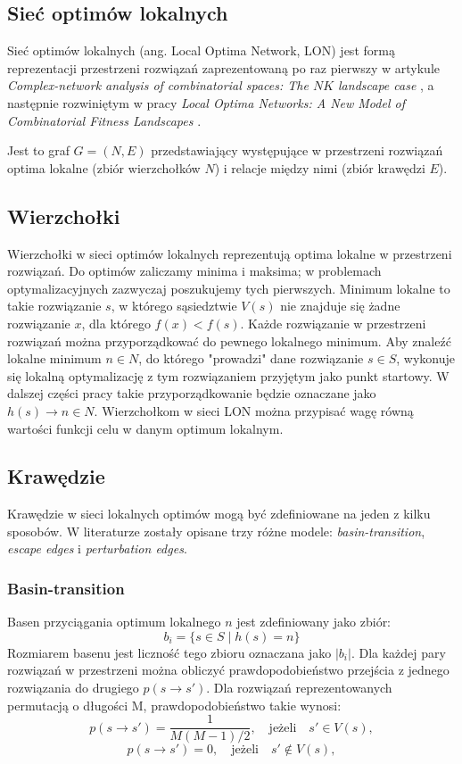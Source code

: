 \subsection{Sieć optimów lokalnych}
Sieć optimów lokalnych (ang. Local Optima Network, LON) jest formą reprezentacji przestrzeni rozwiązań zaprezentowaną po raz pierwszy w artykule \textit{Complex-network analysis of combinatorial spaces: The $NK$ landscape case} \cite{PhysRevE.78.066114},
a następnie rozwiniętym w pracy \textit{Local Optima Networks: A New Model of Combinatorial Fitness Landscapes} \cite{DBLP:journals/corr/OchoaVDT14}.

Jest to graf $G = (N, E)$ przedstawiający występujące w przestrzeni rozwiązań optima lokalne (zbiór wierzchołków $N$)
i relacje między nimi (zbiór krawędzi $E$).

\subsection{Wierzchołki}
Wierzchołki w sieci optimów lokalnych reprezentują optima lokalne w przestrzeni rozwiązań.
Do optimów zaliczamy minima i maksima; w problemach optymalizacyjnych zazwyczaj poszukujemy tych pierwszych.
Minimum lokalne to takie rozwiązanie $s$, w którego sąsiedztwie $V(s)$ nie znajduje się żadne rozwiązanie $x$, dla którego $f(x) < f(s)$.
Każde rozwiązanie w przestrzeni rozwiązań można przyporządkować do pewnego lokalnego minimum.
Aby znaleźć lokalne minimum $n \in{N}$, do którego "prowadzi" dane rozwiązanie $s\in{S}$, wykonuje się lokalną optymalizację
z tym rozwiązaniem przyjętym jako punkt startowy.
W dalszej części pracy takie przyporządkowanie będzie oznaczane jako $h(s) \rightarrow n\in{N}$.
Wierzchołkom w sieci LON można przypisać wagę równą wartości funkcji celu w danym optimum lokalnym.

\subsection{Krawędzie}
Krawędzie w sieci lokalnych optimów mogą być zdefiniowane na jeden z kilku sposobów.
W literaturze \cite{DBLP:journals/corr/OchoaVDT14} \cite{DBLP:conf/gecco/TeixeiraP22} zostały opisane trzy różne modele:
\textit{basin-transition}, \textit{escape edges} i \textit{perturbation edges}.

\subsubsection{Basin-transition}
Basen przyciągania optimum lokalnego $n$ jest zdefiniowany jako zbiór:
$$b_i = \{s\in{S} \mid h(s) = n\}$$
Rozmiarem basenu jest liczność tego zbioru oznaczana jako $|b_i|$.
Dla każdej pary rozwiązań w przestrzeni można obliczyć prawdopodobieństwo przejścia z jednego rozwiązania do drugiego $p(s \rightarrow s')$.
Dla rozwiązań reprezentowanych permutacją o długości M, prawdopodobieństwo takie wynosi:
$$p(s \rightarrow s') = \frac{1}{M(M-1)/2}, \quad \text{jeżeli} \quad s'\in{V(s)},$$
$$p(s \rightarrow s') = 0, \quad \text{jeżeli} \quad s'\notin{V(s)},$$

